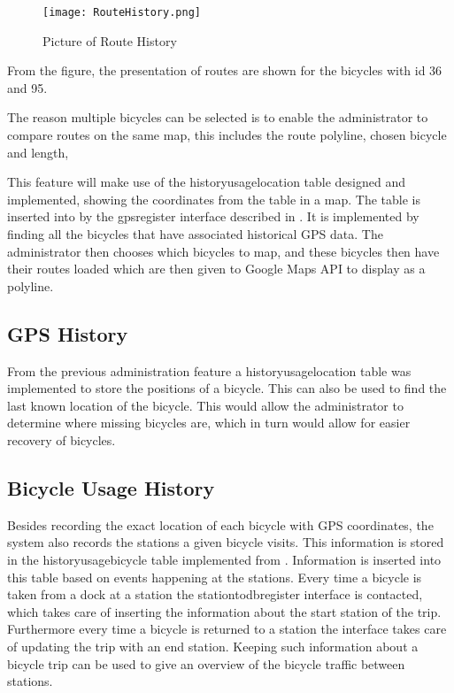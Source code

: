 \begin{figure}[H]
	\centering
	\texttt{[image: RouteHistory.png]}
	\caption{Picture of Route History}
	\label{fig:routehistory}
\end{figure}

From the figure, the presentation of routes are shown for the bicycles with id 36 and 95.

The reason multiple bicycles can be selected is to enable the administrator to compare routes on the same map, this includes the route polyline, chosen bicycle and length,


This feature will make use of the historyusagelocation table designed and implemented, showing the coordinates from the table in a map.
The table is inserted into by the gpsregister interface described in .
It is implemented by finding all the bicycles that have associated historical GPS data.
The administrator then chooses which bicycles to map, and these bicycles then have their routes loaded which are then given to Google Maps API to display as a polyline.

\subsection{GPS History}\label{sec:gpsHistory}
From the previous administration feature a historyusagelocation table was implemented to store the positions of a bicycle.
This can also be used to find the last known location of the bicycle. 
This would allow the administrator to determine where missing bicycles are, which in turn would allow for easier recovery of bicycles.





\subsection{Bicycle Usage History}\label{sec:bicycleUsageHistory}

Besides recording the exact location of each bicycle with GPS coordinates, the system also records the stations a given bicycle visits.
This information is stored in the historyusagebicycle table implemented from .
Information is inserted into this table based on events happening at the stations. 
Every time a bicycle is taken from a dock at a station the stationtodbregister interface is contacted, which takes care of inserting the information about the start station of the trip.
Furthermore every time a bicycle is returned to a station the interface takes care of updating the trip with an end station.
Keeping such information about a bicycle trip can be used to give an overview of the bicycle traffic between stations.

